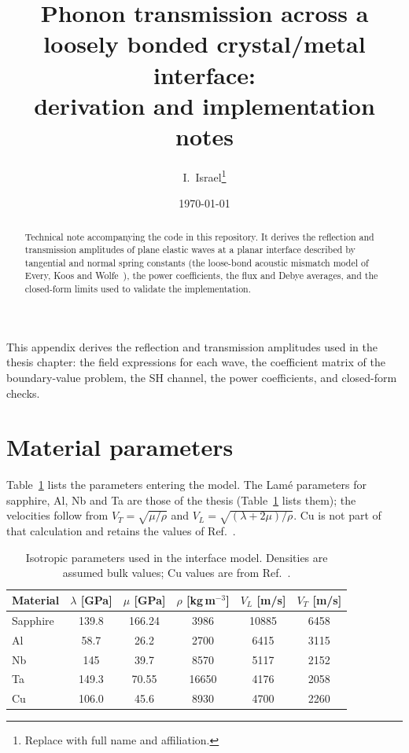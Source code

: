 \documentclass[11pt,a4paper]{article}
\title{Phonon transmission across a loosely bonded crystal/metal interface:\\ derivation and implementation notes}
\author{I.~Israel\thanks{Replace with full name and affiliation.}}
\date{\today}
\begin{document}
\maketitle
\begin{abstract}
Technical note accompanying the code in this repository. It derives the reflection and transmission
amplitudes of plane elastic waves at a planar interface described by tangential and normal spring constants
(the loose-bond acoustic mismatch model of Every, Koos and Wolfe~\cite{Every1984}), the power coefficients,
the flux and Debye averages, and the closed-form limits used to validate the implementation.
\end{abstract}


This appendix derives the reflection and transmission amplitudes used in
the thesis chapter: the field expressions for each wave, the coefficient matrix of
the boundary-value problem, the SH channel, the power coefficients, and closed-form checks.

\section{Material parameters}

Table~\ref{tab:app_materials} lists the parameters entering the model. The Lam\'e parameters
for sapphire, Al, Nb and Ta are those of the thesis (Table~\ref{tab:app_materials} lists them); the velocities follow
from $V_T=\sqrt{\mu/\rho}$ and $V_L=\sqrt{(\lambda+2\mu)/\rho}$. Cu is not part of that
calculation and retains the values of Ref.~\cite{Every1984}.

\begin{table}[H]
\centering
\caption{Isotropic parameters used in the interface model.
Densities are assumed bulk values; Cu values are from Ref.~\cite{Every1984}.}
\label{tab:app_materials}
\begin{tabular}{lccccc}
\toprule
Material & $\lambda$ [GPa] & $\mu$ [GPa] & $\rho$ [kg\,m$^{-3}$] & $V_L$ [m/s] & $V_T$ [m/s]\\
\midrule
Sapphire & 139.8 & 166.24 & 3986  & 10885 & 6458\\
Al       & 58.7  & 26.2   & 2700  & 6415  & 3115\\
Nb       & 145   & 39.7   & 8570  & 5117  & 2152\\
Ta       & 149.3 & 70.55  & 16650 & 4176  & 2058\\
Cu       & 106.0 & 45.6   & 8930  & 4700  & 2260\\
\bottomrule
\end{tabular}
\end{table}
\end{document}
